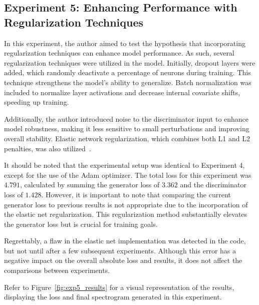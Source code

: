 \subsection{Experiment 5: Enhancing Performance with Regularization Techniques} \label{sec:exp5}

In this experiment, the author aimed to test the hypothesis that incorporating regularization techniques can enhance model performance. As such, several regularization techniques were utilized in the model. Initially, dropout layers were added, which randomly deactivate a percentage of neurons during training. This technique strengthens the model's ability to generalize. Batch normalization was included to normalize layer activations and decrease internal covariate shifts, speeding up training.

Additionally, the author introduced noise to the discriminator input to enhance model robustness, making it less sensitive to small perturbations and improving overall stability. Elastic network regularization, which combines both L1 and L2 penalties, was also utilized~\cite{zou_regularization_2005}.

It should be noted that the experimental setup was identical to Experiment 4, except for the use of the Adam optimizer. The total loss for this experiment was $4.791$, calculated by summing the generator loss of $3.362$ and the discriminator loss of $1.428$. However, it is important to note that comparing the current generator loss to previous results is not appropriate due to the incorporation of the elastic net regularization. This regularization method substantially elevates the generator loss but is crucial for training goals.

Regrettably, a flaw in the elastic net implementation was detected in the code, but not until after a few subsequent experiments. Although this error has a negative impact on the overall absolute loss and results, it does not affect the comparisons between experiments.

Refer to Figure~\ref{fig:exp5_results} for a visual representation of the results, displaying the loss and final spectrogram generated in this experiment.

